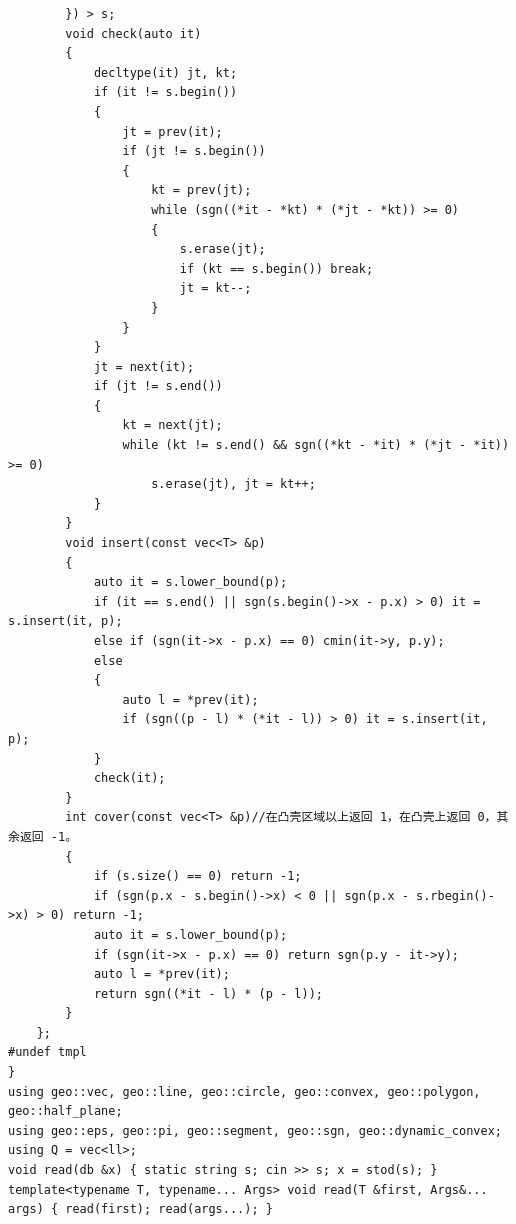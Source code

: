 \documentclass[12pt]{ctexart}
\begin{document}
\begin{lstlisting}
		}) > s;
		void check(auto it)
		{
			decltype(it) jt, kt;
			if (it != s.begin())
			{
				jt = prev(it);
				if (jt != s.begin())
				{
					kt = prev(jt);
					while (sgn((*it - *kt) * (*jt - *kt)) >= 0)
					{
						s.erase(jt);
						if (kt == s.begin()) break;
						jt = kt--;
					}
				}
			}
			jt = next(it);
			if (jt != s.end())
			{
				kt = next(jt);
				while (kt != s.end() && sgn((*kt - *it) * (*jt - *it)) >= 0)
					s.erase(jt), jt = kt++;
			}
		}
		void insert(const vec<T> &p)
		{
			auto it = s.lower_bound(p);
			if (it == s.end() || sgn(s.begin()->x - p.x) > 0) it = s.insert(it, p);
			else if (sgn(it->x - p.x) == 0) cmin(it->y, p.y);
			else
			{
				auto l = *prev(it);
				if (sgn((p - l) * (*it - l)) > 0) it = s.insert(it, p);
			}
			check(it);
		}
		int cover(const vec<T> &p)//在凸壳区域以上返回 1，在凸壳上返回 0，其余返回 -1。
		{
			if (s.size() == 0) return -1;
			if (sgn(p.x - s.begin()->x) < 0 || sgn(p.x - s.rbegin()->x) > 0) return -1;
			auto it = s.lower_bound(p);
			if (sgn(it->x - p.x) == 0) return sgn(p.y - it->y);
			auto l = *prev(it);
			return sgn((*it - l) * (p - l));
		}
	};
#undef tmpl
}
using geo::vec, geo::line, geo::circle, geo::convex, geo::polygon, geo::half_plane;
using geo::eps, geo::pi, geo::segment, geo::sgn, geo::dynamic_convex;
using Q = vec<ll>;
void read(db &x) { static string s; cin >> s; x = stod(s); }
template<typename T, typename... Args> void read(T &first, Args&... args) { read(first); read(args...); }
\end{lstlisting}
\end{document}
